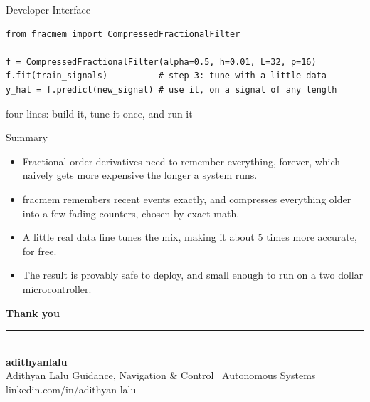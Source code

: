 \documentclass[10pt,aspectratio=169]{beamer}
\begin{document}
\begin{frame}[fragile]{Developer Interface}
  \begin{center}
  \small
  \begin{verbatim}
from fracmem import CompressedFractionalFilter

f = CompressedFractionalFilter(alpha=0.5, h=0.01, L=32, p=16)
f.fit(train_signals)          # step 3: tune with a little data
y_hat = f.predict(new_signal) # use it, on a signal of any length
  \end{verbatim}
  \end{center}
  \vspace{0.6em}
  \centering\small\color{slate} four lines: build it, tune it once, and run it
\end{frame}

\begin{frame}{Summary}
  \begin{itemize}
    \setlength\itemsep{0.9em}
    \item Fractional order derivatives need to remember everything, forever, which naively gets more expensive the longer a system runs.
    \item fracmem remembers recent events exactly, and compresses everything older into a few fading counters, chosen by exact math.
    \item A little real data fine tunes the mix, making it about 5 times more accurate, for free.
    \item The result is provably safe to deploy, and small enough to run on a two dollar microcontroller.
  \end{itemize}
\end{frame}

{
\begin{frame}[plain]
  \vspace{1.4cm}
  \begin{center}
    {\Large\bfseries\color{inkNavy} Thank you}\\[1.4em]
    {\color{amberAccent}\rule{0.35\linewidth}{1.2pt}}\\[1.4em]
    {\huge\bfseries\color{inkNavy} adithyanlalu}\\[0.5em]
    {\small\color{slate} Adithyan Lalu \; \textbar\; Guidance, Navigation \& Control \textbar\ Autonomous Systems}\\[0.2em]
    {\small\color{slate} linkedin.com/in/adithyan-lalu}
  \end{center}
\end{frame}
}
\end{document}
